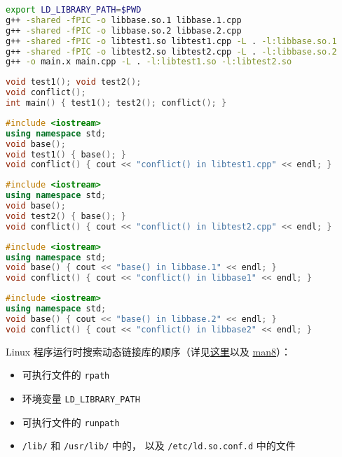 \begin{lstlisting}[language=bash, caption=make.sh（注意要 source make.sh 而不是 ./make.sh）]
export LD_LIBRARY_PATH=$PWD
g++ -shared -fPIC -o libbase.so.1 libbase.1.cpp
g++ -shared -fPIC -o libbase.so.2 libbase.2.cpp
g++ -shared -fPIC -o libtest1.so libtest1.cpp -L . -l:libbase.so.1
g++ -shared -fPIC -o libtest2.so libtest2.cpp -L . -l:libbase.so.2
g++ -o main.x main.cpp -L . -l:libtest1.so -l:libtest2.so
\end{lstlisting}

\begin{lstlisting}[language=cpp, caption=main.cpp]
void test1(); void test2();
void conflict();
int main() { test1(); test2(); conflict(); }
\end{lstlisting}

\begin{lstlisting}[language=cpp, caption=libtest1.cpp]
#include <iostream>
using namespace std;
void base();
void test1() { base(); }
void conflict() { cout << "conflict() in libtest1.cpp" << endl; }
\end{lstlisting}

\begin{lstlisting}[language=cpp, caption=libtest2.cpp]
#include <iostream>
using namespace std;
void base();
void test2() { base(); }
void conflict() { cout << "conflict() in libtest2.cpp" << endl; }
\end{lstlisting}

\begin{lstlisting}[language=cpp, caption=libtest1.cpp]
#include <iostream>
using namespace std;
void base() { cout << "base() in libbase.1" << endl; }
void conflict() { cout << "conflict() in libbase1" << endl; }
\end{lstlisting}

\begin{lstlisting}[language=cpp, caption=libtest2.cpp]
#include <iostream>
using namespace std;
void base() { cout << "base() in libbase.2" << endl; }
void conflict() { cout << "conflict() in libbase2" << endl; }
\end{lstlisting}

Linux 程序运行时搜索动态链接库的顺序（详见\href{https://unix.stackexchange.com/questions/22926/where-do-executables-look-for-shared-objects-at-runtime}{这里}以及 \href{https://man7.org/linux/man-pages/man8/ld.so.8.html}{man8}）：
\begin{itemize}
\item 可执行文件的 \verb|rpath|
\item 环境变量 \verb|LD_LIBRARY_PATH|
\item 可执行文件的 \verb|runpath|
\item \verb|/lib/| 和 \verb|/usr/lib/| 中的， 以及 \verb|/etc/ld.so.conf.d| 中的文件
\end{itemize}

